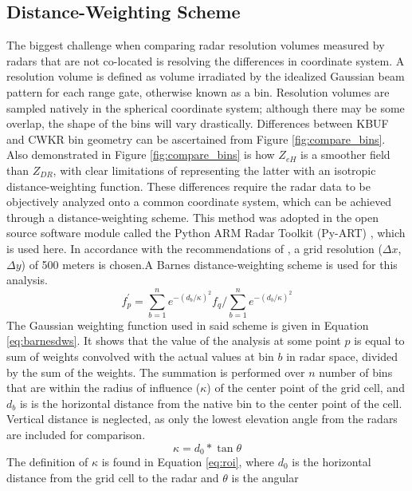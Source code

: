 \subsection{Distance-Weighting Scheme}
The biggest challenge when comparing radar resolution volumes measured by radars that are not co-located is resolving the differences in coordinate system. A
resolution volume is defined as volume irradiated by the idealized Gaussian beam pattern for each range gate, otherwise known as a bin. Resolution volumes
are sampled natively in the spherical coordinate system; although there may be some overlap, the shape of the bins will vary drastically. Differences between
KBUF and CWKR bin geometry can be ascertained from Figure \ref{fig:compare_bins}. Also demonstrated in Figure \ref{fig:compare_bins} is how $Z_{eH}$ is a smoother field than $Z_{DR}$, with clear limitations of representing the latter with an isotropic distance-weighting function.
These differences require the radar data to be objectively analyzed onto a common coordinate system, which can be achieved through a distance-weighting
scheme. This method was adopted in the open source software module called the Python ARM Radar Toolkit (Py-ART) \citep{Py-ART}, which is used here. In
accordance with the recommendations of \cite{Pauly1990}, a grid resolution ($\Delta x$, $\Delta y$) of 500 meters is chosen.A Barnes distance-weighting scheme is used for this analysis. 
\begin{equation}\label{eq:barnesdws}
f^{'}_{p} = \sum_{b=1}^n  e^{-(d_b/\kappa)^{2}} f_q  \bigg/ \sum_{b=1}^n e^{-(d_b/\kappa)^{2}}
\end{equation}
The Gaussian weighting function used in said scheme is given in Equation \ref{eq:barnesdws}. It shows that the value of the analysis at some point $p$ is
equal to sum of weights convolved with the actual values at bin $b$ in radar space, divided by the sum of the weights. The summation is performed over $n$
number of bins that are within the radius of influence ($\kappa$) of the center point of the grid cell, and $d_{b}$ is is the horizontal distance from the native
bin to the center point of the cell. Vertical distance is neglected, as only the lowest elevation angle from the radars are included for comparison.
\begin{equation}\label{eq:roi}
\kappa = d_{0} * \tan{\theta}
\end{equation}
The definition of $\kappa$ is found in Equation \ref{eq:roi}, where $d_{0}$ is the horizontal distance from the grid cell to the radar and $\theta$ is the angular\
